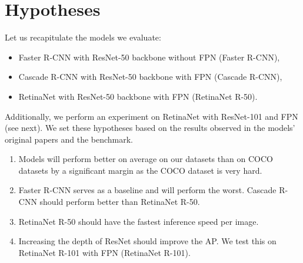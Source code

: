 \section{Hypotheses}
Let us recapitulate the models we evaluate:
\begin{itemize}
	\item Faster R-CNN with ResNet-50 backbone without FPN (Faster R-CNN),
	\item Cascade R-CNN with ResNet-50 backbone with FPN (Cascade R-CNN),
	\item RetinaNet with ResNet-50 backbone with FPN (RetinaNet R-50).
\end{itemize}
Additionally, we perform an experiment on RetinaNet with ResNet-101 and FPN
(see next). We set these hypotheses based on the results observed in the
models' original papers and the  benchmark.
\renewcommand{\theenumi}{\alph{enumi}}
\begin{enumerate}
	\item Models will perform better on average on our datasets than on COCO
	      datasets by a significant margin as the COCO dataset is very hard.
	\item Faster R-CNN serves as a baseline and will perform the worst. Cascade
	      R-CNN should perform better than RetinaNet R-50.
	\item RetinaNet R-50 should have the fastest inference speed per image.
	\item Increasing the depth of ResNet should improve the AP. We test this on
	      RetinaNet R-101 with FPN (RetinaNet R-101).
\end{enumerate}

